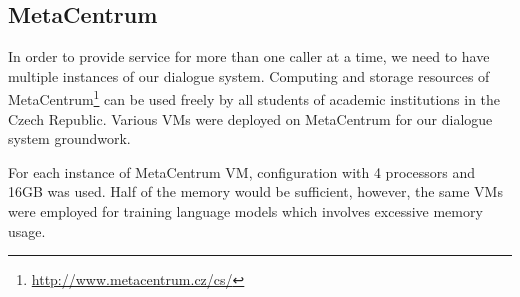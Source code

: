 \subsection{MetaCentrum}

In order to provide service for more than one caller at a time, we need to have multiple instances of our dialogue system.
Computing and storage resources of MetaCentrum\footnote{\url{http://www.metacentrum.cz/cs/}} can be used freely by all students of academic institutions in the Czech Republic.
Various VMs were deployed on MetaCentrum for our dialogue system groundwork.

For each instance of MetaCentrum VM, configuration with 4 processors and 16GB was used.
Half of the memory would be sufficient, however, the same VMs were employed for training language models which involves excessive memory usage.





